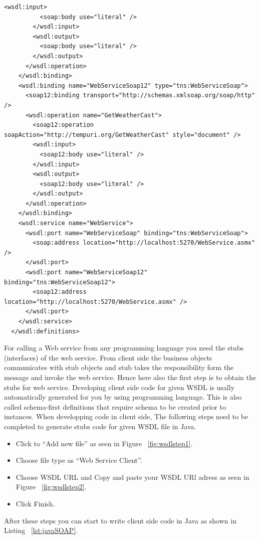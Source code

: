 \begin{lstlisting}[caption=WSDL Document for Weathercast Provider, label=lst:wsdldocument]
        <wsdl:input>
          <soap:body use="literal" />
        </wsdl:input>
        <wsdl:output>
          <soap:body use="literal" />
        </wsdl:output>
      </wsdl:operation>
    </wsdl:binding>
    <wsdl:binding name="WebServiceSoap12" type="tns:WebServiceSoap">
      <soap12:binding transport="http://schemas.xmlsoap.org/soap/http" />
      <wsdl:operation name="GetWeatherCast">
        <soap12:operation soapAction="http://tempuri.org/GetWeatherCast" style="document" />
        <wsdl:input>
          <soap12:body use="literal" />
        </wsdl:input>
        <wsdl:output>
          <soap12:body use="literal" />
        </wsdl:output>
      </wsdl:operation>
    </wsdl:binding>
    <wsdl:service name="WebService">
      <wsdl:port name="WebServiceSoap" binding="tns:WebServiceSoap">
        <soap:address location="http://localhost:5270/WebService.asmx" />
      </wsdl:port>
      <wsdl:port name="WebServiceSoap12" binding="tns:WebServiceSoap12">
        <soap12:address location="http://localhost:5270/WebService.asmx" />
      </wsdl:port>
    </wsdl:service>
  </wsdl:definitions>
\end{lstlisting}
For calling a Web service from any programming language you need the stubs (interfaces) of the web service. From client side the business objects communicates with stub objects and stub takes the responsibility form the message and invoke the web service. Hence here also the first step is to obtain the stubs for  web service. Developing client side code for given WSDL is usally automatically generated for you by using programming language. This is also called  schema-first definitions that require schema to be created prior to instances. When developping code in client side, The following steps need to be completed to generate stubs code for given WSDL file in Java.
\begin{itemize}
  \item Click to “Add new file” as seen in Figure ~\ref{fig:wsdlstep1}.
  \item Choose file type as “Web Service Client”.
  \item Choose WSDL URL and Copy and paste your WSDL URl adress as seen in Figure ~\ref{fig:wsdlstep2}.
  \item Click Finish.
\end{itemize}

After these steps you can start to write client side code in Java as shown in Listing ~\ref{lst:javaSOAP}.

